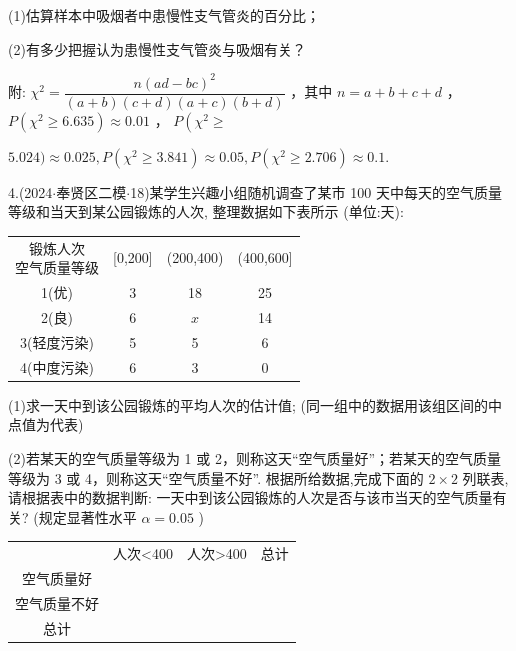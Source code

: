 (1)估算样本中吸烟者中患慢性支气管炎的百分比；

(2)有多少把握认为患慢性支气管炎与吸烟有关？

附: ${\chi }^{2} = \dfrac{n{\left( ad - bc\right) }^{2}}{\left( {a + b}\right) \left( {c + d}\right) \left( {a + c}\right) \left( {b + d}\right) }$ ，其中 $n = a + b + c + d$ ， $P\left( {{\chi }^{2} \geq  {6.635}}\right)  \approx  {0.01}$ ， $P\left( {{\chi }^{2} \geq  }\right.$

${5.024}) \approx  {0.025},P\left( {{\chi }^{2} \geq  {3.841}}\right)  \approx  {0.05},P\left( {{\chi }^{2} \geq  {2.706}}\right)  \approx  {0.1}$.

4.(2024$\cdot$奉贤区二模$\cdot$18)某学生兴趣小组随机调查了某市 100 天中每天的空气质量等级和当天到某公园锻炼的人次, 整理数据如下表所示 (单位:天):

\begin{center}

\begin{tabular}{|c|c|c|c|}
\hline
\makecell{ 锻炼人次 \\ 空气质量等级 } & [0,200] & (200,400) & (400,600] \\
\cline{1-4}
1(优) & 3 & 18 & 25 \\
\cline{1-4}
2(良) & 6 & $x$ & 14 \\
\cline{1-4}
3(轻度污染) & 5 & 5 & 6 \\
\cline{1-4}
4(中度污染) & 6 & 3 & 0 \\
\cline{1-4}
\hline
\end{tabular}
\end{center}

(1)求一天中到该公园锻炼的平均人次的估计值; (同一组中的数据用该组区间的中点值为代表)

(2)若某天的空气质量等级为 1 或 2，则称这天“空气质量好”；若某天的空气质量等级为 3 或 4，则称这天“空气质量不好”. 根据所给数据,完成下面的 $2 \times  2$ 列联表,请根据表中的数据判断: 一天中到该公园锻炼的人次是否与该市当天的空气质量有关? (规定显著性水平 $\alpha  = {0.05}$ )

\begin{center}

\begin{tabular}{|c|c|c|c|}
\hline
\phantom{X} & 人次<400 & 人次>400 & 总计 \\
\cline{1-4}
空气质量好 & \phantom{X} & \phantom{X} & \phantom{X} \\
\cline{1-4}
空气质量不好 & \phantom{X} & \phantom{X} & \phantom{X} \\
\cline{1-4}
总计 & \phantom{X} & \phantom{X} & \phantom{X} \\
\cline{1-4}
\hline
\end{tabular}
\end{center}

